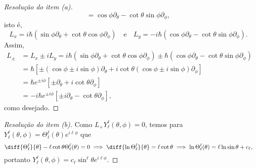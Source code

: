 \begin{proof}[Resolução do item (a)]
\begin{equation*}
                                    = \cos\phi \partial_\theta- \cot\theta \sin\phi \partial_\phi,
    \end{equation*}
    isto é,
    \begin{equation*}
        L_x = i\hbar \left(\sin\phi \partial_\theta + \cot\theta \cos\phi \partial_\phi\right)\quad\text{e}\quad
        L_y = -i\hbar \left(\cos\phi \partial_\theta- \cot\theta \sin\phi \partial_\phi\right).
    \end{equation*}
    Assim,
    \begin{align*}
        L_\pm &= L_x \pm i L_y = i\hbar\left(\sin\phi \partial_\theta + \cot\theta \cos\phi\partial_\phi\right) \pm \hbar \left(\cos\phi \partial_\theta- \cot\theta \sin\phi \partial_\phi\right)\\
              &= \hbar \left[\pm\left(\cos\phi \pm i \sin\phi\right)\partial_\theta  + i\cot\theta\left(\cos\phi \pm i\sin\phi\right)\partial_\phi\right]\\
              &= \hbar e^{\pm i \phi}\left[\pm\partial_\theta + i\cot\theta \partial_\phi\right]\\
              &= -i\hbar e^{\pm i \phi} \left[\pm i\partial_\theta - \cot\theta \partial_\phi\right],
    \end{align*}
    como desejado.
\end{proof}
\begin{proof}[Resolução do item (b)]
    Como \(L_+ Y_\ell^\ell(\theta,\phi) = 0\), temos para \(Y_{\ell}^\ell(\theta,\phi) = \Theta_\ell^\ell(\theta)e^{i\ell \phi}\) que
    \begin{equation*}
        \diff{\Theta_\ell^\ell}{\theta} - \ell\cot\theta \Theta_\ell^\ell(\theta) = 0 \implies \diff{\ln\Theta_\ell^\ell}{\theta} = \ell \cot\theta \implies \ln \Theta_\ell^\ell(\theta) = \ell \ln \sin\theta + c_\ell,
    \end{equation*}
    portanto \(Y_\ell^\ell(\theta, \phi) = c_\ell \sin^\ell\theta e^{i\ell\phi}\).
\end{proof}
